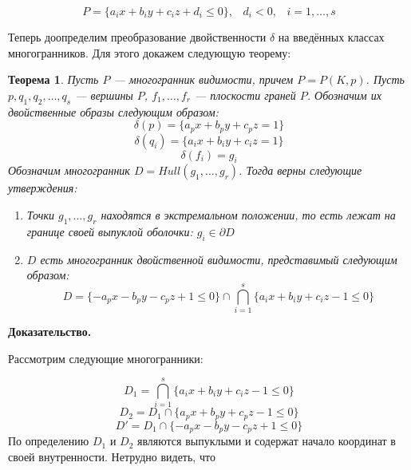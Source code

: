 \documentclass[a4paper, 10pt]{article}
\theoremstyle{definition}
\theoremstyle{plain}
\newtheorem{SmartTheorem}{Теорема}
\theoremstyle{plain}
\begin{document}
\begin{equation}
 P = \{a_{i} x + b_{i} y + c_{i} z + d_{i} \leq 0 \}, \;\;\;
 d_{i} < 0, \;\;\;
 i = 1, \ldots, s
\end{equation}

Теперь доопределим преобразование двойственности $\delta$ на введённых классах
многогранников. Для этого докажем следующую теорему:

\begin{SmartTheorem}
\label{theorem:duality-expansion}
 Пусть $P$ --- многогранник видимости, причем $P = P(K, p)$. Пусть
 $p, q_{1}, q_{2}, \ldots, q_{s}$ --- вершины $P$, $f_{1}, \ldots, f_{r}$ ---
 плоскости граней $P$. Обозначим их двойственные образы следующим образом:
 \begin{equation}
  \delta(p) = \{a_{p} x + b_{p} y + c_{p} z = 1\}
 \end{equation}
 \begin{equation}
  \delta(q_{i}) = \{a_{i} x + b_{i} y + c_{i} z = 1\}
 \end{equation}
 \begin{equation}
  \delta(f_{i}) = g_{i}
 \end{equation}
 Обозначим многогранник $D = Hull(g_{1}, \ldots, g_{r})$. Тогда верны следующие
 утверждения:
 \begin{enumerate}
  \item Точки $g_{1}, \ldots, g_{r}$ находятся в экстремальном положении, то
  есть лежат на границе своей выпуклой оболочки: $g_{i} \in \partial D$
  \item $D$ есть многогранник двойственной видимости, представимый следующим
  образом:
  \begin{equation}
  \label{equation:dual-visibility-polyhedron}
   D = \{-a_{p} x - b_{p} y - c_{p} z + 1 \leq 0\} \cap
   \bigcap \limits_{i = 1}^{s} \{a_{i} x + b_{i} y + c_{i} z - 1 \leq 0\}
  \end{equation}
 \end{enumerate}
\end{SmartTheorem}

\textbf{Доказательство.}

Рассмотрим следующие многогранники:

\begin{equation}
 D_{1} = \bigcap \limits_{i = 1}^{s} \{a_{i} x + b_{i} y + c_{i} z - 1 \leq 0\}
\end{equation}
\begin{equation}
 D_{2} = D_{1} \cap \{a_{p} x + b_{p} y + c_{p} z - 1 \leq 0\}
\end{equation}
\begin{equation}
 D' = D_{1} \cap \{-a_{p} x - b_{p} y - c_{p} z + 1 \leq 0\}
\end{equation}
По определению $D_{1}$ и $D_{2}$ являются выпуклыми и содержат начало координат
в своей внутренности. Нетрудно видеть, что
\end{document}
